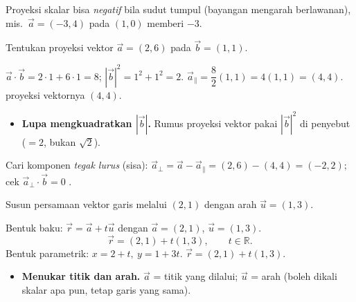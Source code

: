 \begin{variasi}
Proyeksi skalar bisa \emph{negatif} bila sudut tumpul (bayangan mengarah
berlawanan), mis.\ $\vec a=(-3,4)$ pada $(1,0)$ memberi $-3$.
\end{variasi}

\begin{soalbox}{}
Tentukan proyeksi vektor $\vec a=(2,6)$ pada $\vec b=(1,1)$.
\end{soalbox}

\jawab
{} $\vec a\cdot\vec b=2\cdot1+6\cdot1=8$; $|\vec b|^2=1^2+1^2=2$.
 $\vec a_\parallel=\dfrac{8}{2}(1,1)=4(1,1)=(4,4)$.
\jadi proyeksi vektornya $(4,4)$.

\begin{jebakan}
\begin{itemize}[leftmargin=*,topsep=2pt]
  \item \textbf{Lupa mengkuadratkan $|\vec b|$.} Rumus proyeksi vektor pakai
  $|\vec b|^2$ di penyebut ($=2$, bukan $\sqrt2$).
\end{itemize}
\end{jebakan}

\begin{variasi}
Cari komponen \emph{tegak lurus} (sisa): $\vec a_\perp=\vec a-\vec a_\parallel
=(2,6)-(4,4)=(-2,2)$; cek $\vec a_\perp\cdot\vec b=0$ \checkmark.
\end{variasi}

\begin{soalbox}{}
Susun persamaan vektor garis melalui $(2,1)$ dengan arah $\vec u=(1,3)$.
\end{soalbox}

\jawab
{} Bentuk baku: $\vec r=\vec a+t\vec u$ dengan $\vec a=(2,1)$,
$\vec u=(1,3)$.
\[
\vec r=(2,1)+t(1,3),\qquad t\in\mathbb R.
\]
 Bentuk parametrik: $x=2+t,\ y=1+3t$.
\jadi $\vec r=(2,1)+t(1,3)$.

\begin{jebakan}
\begin{itemize}[leftmargin=*,topsep=2pt]
  \item \textbf{Menukar titik dan arah.} $\vec a$ = titik yang dilalui;
  $\vec u$ = arah (boleh dikali skalar apa pun, tetap garis yang sama).
\end{itemize}
\end{jebakan}

